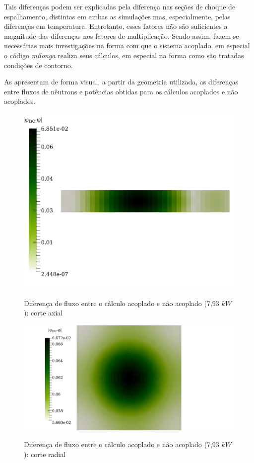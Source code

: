 Tais diferenças podem ser explicadas pela diferença nas seções de choque de espalhamento,
distintas em ambas as simulações mas, especialmente, pelas diferenças em temperatura.
Entretanto, esses fatores não são suficientes a magnitude das diferenças nos fatores
de multiplicação. Sendo assim, fazem-se necessárias mais investigações na forma com
que o sistema acoplado, em especial o código \textit{milonga} realiza seus cálculos,
em especial na forma como são tratadas condições de contorno.

As  apresentam de forma visual, a partir da geometria utilizada,
as diferenças entre fluxos de nêutrons e potências obtidas para os cálculos
acoplados e não acoplados.

\begin{figure}[htb]
  \caption{Diferença de fluxo entre o cálculo acoplado e não acoplado (7,93 $kW$): corte axial}
  \centering\includegraphics[scale=0.7]{figuras/diff-flux-axial.png}
  \label{fig:f1}
\end{figure}

\begin{figure}[htb]
  \caption{Diferença de fluxo entre o cálculo acoplado e não acoplado (7,93 $kW$): corte radial}
  \centering\includegraphics[scale=0.6]{figuras/diff-flux-radial.png}
  \label{fig:f2}
\end{figure}

